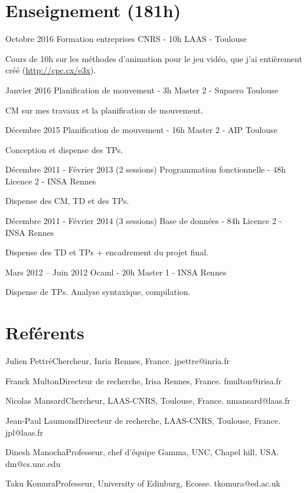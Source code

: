 \documentclass{tccv}
\begin{document}
\section{Enseignement (181h)}
\begin{eventlist}
\item{Octobre 2016}
     {Formation entreprises CNRS - 10h}
     {LAAS - Toulouse}
     
Cours de 10h sur les m\'ethodes d'animation pour le jeu vid\'eo, que
j'ai enti\`erement cr\'e\'e (\url{http://cpc.cx/e3x}).

\item{Janvier 2016}
     {Planification de mouvement - 3h}
     {Master 2 - Supaero Toulouse}
     
CM sur mes travaux et la planification de mouvement.

\item{D\'ecembre 2015}
     {Planification de mouvement - 16h}
     {Master 2 - AIP Toulouse}
     
Conception et dispense des TPs.

\item{D\'ecembre 2011 - F\'evrier 2013 (2 sessions)}
     {Programmation fonctionnelle - 48h}
     {Licence 2 - INSA Rennes}
     
Dispense des CM, TD et des TPs. %
     

\item{D\'ecembre 2011 - F\'evrier 2014 (3 sessions)}
     {Base de donn\'ees - 84h}
     {Licence 2 - INSA Rennes}
     
Dispense des TD et TPs + encadrement du projet final.

\item{Mars 2012 -- Juin 2012}
     {Ocaml - 20h}
     {Master 1 - INSA Rennes}

	Dispense de TPs. Analyse syntaxique, compilation.

\end{eventlist}


\section{Ref\'erents}
\begin{factlist}
\item{Julien Pettr\'e}{Chercheur, Inria Rennes, France. jpettre@inria.fr}
\item{Franck Multon}{Directeur de recherche, Irisa Rennes, France. fmulton@irisa.fr}
\item{Nicolas Mansard}{Chercheur, LAAS-CNRS, Toulouse, France. nmansard@laas.fr}
\item{Jean-Paul Laumond}{Directeur de recherche, LAAS-CNRS, Toulouse, France. jpl@laas.fr}
\item{Dinesh Manocha}{Professeur, chef d'\'equipe Gamma, UNC, Chapel hill, USA. dm@cs.unc.edu}
\item{Taku Komura}{Professeur, University of Edinburg, Ecosse. tkomura@ed.ac.uk}
\end{factlist}
\end{document}
